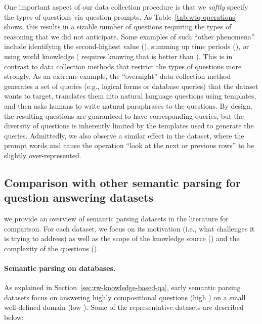 One important aspect of our data collection procedure
is that we \emph{softly} specify the types of questions
via question prompts.
As Table~\ref{tab:wtq-operations} shows,
this results in a sizable number of questions
requiring the types of reasoning that we did not anticipate.
Some examples of such ``other phenomena''
include identifying the second-highest value
(),
summing up time periods
(),
or using world knowledge
(
requires knowing that  is better than ).
This is in contrast to data collection methods
that restrict the types of questions more strongly.
As an extreme example,
the ``overnight'' data collection method
\cite{wang2015overnight}
generates a set of queries
(e.g., logical forms or database queries)
that the dataset wants to target,
translates them into natural language questions using templates,
and then asks humans to write natural paraphrases to the questions.
By design,
the resulting questions are guaranteed
to have corresponding queries,
but the diversity of questions is inherently limited
by the templates used to generate the queries.
Admittedly, we also observe a similar effect
in the \wtq dataset,
where the prompt words  and 
cause the operation
``look at the next or previous rows'' to be slightly over-represented.


\subsection{Comparison with other semantic parsing for
question answering datasets}
\label{sec:wtq-other-datasets}

we provide an overview of semantic parsing datasets
in the literature for comparison.
For each dataset, we focus on its motivation
(i.e., what challenges it is trying to address) as well as 
the scope of the knowledge source (\Breadth)
and the complexity of the questions (\Depth).

\paragraph{Semantic parsing on databases.}
As explained in Section~\ref{sec:rw-knowledge-based-qa},
early semantic parsing datasets focus on answering
highly compositional questions (high \Depth)
on a small well-defined domain (low \Breadth).
Some of the representative datasets are described below:

